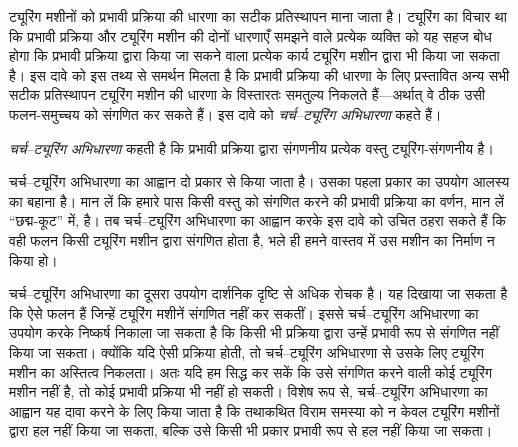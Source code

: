 \documentclass[../../../include/open-logic-section]{subfiles}
\begin{document}

ट्यूरिंग मशीनों को प्रभावी प्रक्रिया की धारणा का सटीक प्रतिस्थापन माना
जाता है। ट्यूरिंग का विचार था कि प्रभावी प्रक्रिया और ट्यूरिंग मशीन की
दोनों धारणाएँ समझने वाले प्रत्येक व्यक्ति को यह सहज बोध होगा कि प्रभावी
प्रक्रिया द्वारा किया जा सकने वाला प्रत्येक कार्य ट्यूरिंग मशीन द्वारा
भी किया जा सकता है। इस दावे को इस तथ्य से समर्थन मिलता है कि प्रभावी
प्रक्रिया की धारणा के लिए प्रस्तावित अन्य सभी सटीक प्रतिस्थापन ट्यूरिंग
मशीन की धारणा के विस्तारतः समतुल्य निकलते हैं---अर्थात् वे ठीक उसी
फलन-समुच्चय को संगणित कर सकते हैं। इस दावे को \emph{चर्च--ट्यूरिंग
अभिधारणा} कहते हैं।

\begin{defn}[चर्च--ट्यूरिंग अभिधारणा]
\emph{चर्च--ट्यूरिंग अभिधारणा} कहती है कि प्रभावी प्रक्रिया द्वारा
संगणनीय प्रत्येक वस्तु ट्यूरिंग-संगणनीय है।
\end{defn}

चर्च--ट्यूरिंग अभिधारणा का आह्वान दो प्रकार से किया जाता है। उसका पहला
प्रकार का उपयोग आलस्य का बहाना है। मान लें कि हमारे पास किसी वस्तु को
संगणित करने की प्रभावी प्रक्रिया का वर्णन, मान लें ``छद्म-कूट'' में,
है। तब चर्च--ट्यूरिंग अभिधारणा का आह्वान करके इस दावे को उचित ठहरा सकते
हैं कि वही फलन किसी ट्यूरिंग मशीन द्वारा संगणित होता है, भले ही हमने
वास्तव में उस मशीन का निर्माण न किया हो।

चर्च--ट्यूरिंग अभिधारणा का दूसरा उपयोग दार्शनिक दृष्टि से अधिक रोचक है।
यह दिखाया जा सकता है कि ऐसे फलन हैं जिन्हें ट्यूरिंग मशीनें संगणित नहीं
कर सकतीं। इससे चर्च--ट्यूरिंग अभिधारणा का उपयोग करके निष्कर्ष निकाला जा
सकता है कि किसी भी प्रक्रिया द्वारा उन्हें प्रभावी रूप से संगणित नहीं
किया जा सकता। क्योंकि यदि ऐसी प्रक्रिया होती, तो चर्च--ट्यूरिंग
अभिधारणा से उसके लिए ट्यूरिंग मशीन का अस्तित्व निकलता। अतः यदि हम सिद्ध
कर सकें कि उसे संगणित करने वाली कोई ट्यूरिंग मशीन नहीं है, तो कोई
प्रभावी प्रक्रिया भी नहीं हो सकती। विशेष रूप से, चर्च--ट्यूरिंग
अभिधारणा का आह्वान यह दावा करने के लिए किया जाता है कि तथाकथित विराम
समस्या को न केवल ट्यूरिंग मशीनों द्वारा हल नहीं किया जा सकता, बल्कि उसे
किसी भी प्रकार प्रभावी रूप से हल नहीं किया जा सकता।
\end{document}
